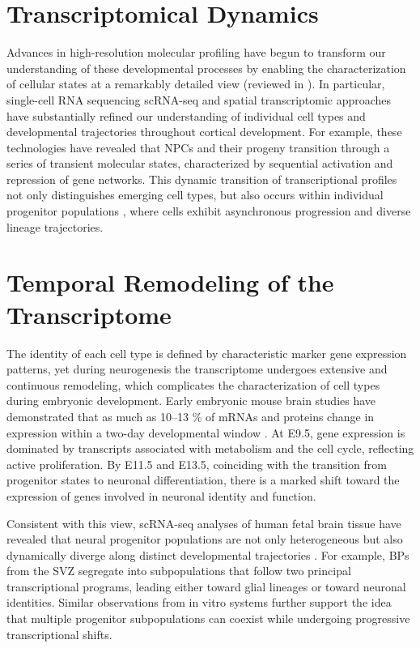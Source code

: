 \section{Transcriptomical Dynamics}
Advances in high-resolution molecular profiling have begun to transform our understanding of these developmental processes by enabling the characterization of cellular states at a remarkably detailed view (reviewed in \citep{BRISCOELookingNeurodevelopmentBig2020}).  In particular, single-cell RNA sequencing 
\gls{scRNA-seq} and spatial transcriptomic approaches have substantially refined our understanding of individual cell types and developmental trajectories throughout cortical development. For example, these technologies have revealed that NPCs and their progeny transition through a series of transient molecular states, characterized by sequential activation and repression of gene networks. This dynamic transition of transcriptional profiles not only distinguishes emerging cell types, but also occurs within individual progenitor populations 
\citep{RUANProgenitorCellDiversity2021}, where cells exhibit asynchronous progression and diverse lineage trajectories. 

\section{Temporal Remodeling of the Transcriptome}
The identity of each cell type is defined by characteristic marker gene expression patterns, yet during neurogenesis the transcriptome undergoes extensive and continuous remodeling, which complicates the characterization of cell types during embryonic development. Early embryonic mouse brain studies have demonstrated that as much as 10–13 \% of mRNAs and proteins change in expression within a two-day developmental window \citep{HARTLTranscriptomeProteomeAnalysis2008}. 
At E9.5, gene expression is dominated by transcripts associated with metabolism and the cell cycle, reflecting active proliferation. By E11.5 and E13.5, coinciding with the transition from progenitor states to neuronal differentiation, there is a marked shift toward the expression of genes involved in neuronal identity and function.

Consistent with this view, scRNA-seq analyses of human fetal brain tissue have revealed that neural progenitor populations are not only heterogeneous but also dynamically diverge along distinct developmental trajectories \citep{SILVESTRISSinglecellTranscriptomicProfiling}.
For example, BPs from the SVZ segregate into subpopulations that follow two principal transcriptional programs, leading either toward glial lineages or toward neuronal identities. Similar observations from in vitro systems further support the idea that multiple progenitor subpopulations can coexist while undergoing progressive transcriptional shifts.

